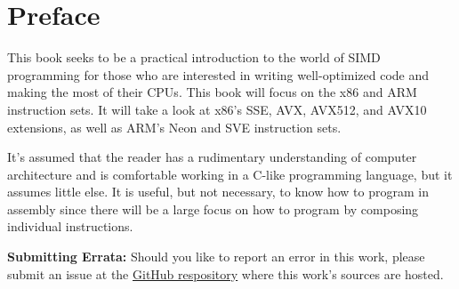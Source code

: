 \chapter*{Preface}
This book seeks to be a practical introduction to the world of SIMD programming for those who are
interested in writing well-optimized code and making the most of their CPUs. This book will focus on
the x86 and ARM instruction sets. It will take a look at x86's SSE, AVX, AVX512, and AVX10
extensions, as well as ARM's Neon and SVE instruction sets.

It's assumed that the reader has a rudimentary understanding of computer architecture and is
comfortable working in a C-like programming language, but it assumes little else. It is useful, but
not necessary, to know how to program in assembly since there will be a large focus on how to
program by composing individual instructions.

\newpage

\textbf{Submitting Errata:} Should you like to report an error in this work,
please submit an issue at the
\href{https://github.com/HugeONotation/An_introduction_to_simd_programming}{GitHub
respository} where this work's sources are hosted.
